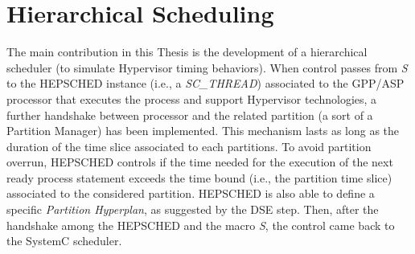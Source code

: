 \section{Hierarchical Scheduling}
%
The main contribution in this Thesis is the development of a hierarchical scheduler (to simulate Hypervisor timing behaviors). When control passes from \textit{S} to the HEPSCHED instance (i.e., a \textit{SC\_THREAD}) associated to the GPP/ASP processor that executes the process and support Hypervisor technologies, a further handshake between processor and the related partition (a sort of a Partition Manager) has been implemented. This mechanism lasts as long as the duration of the time slice associated to each partitions. To avoid partition overrun, HEPSCHED controls if the time needed for the execution of the next ready process statement exceeds the time bound (i.e., the partition time slice) associated to the considered partition. HEPSCHED is also able to define a specific \textit{Partition Hyperplan}, as suggested by the DSE step. Then, after the handshake among the HEPSCHED and the macro \textit{S}, the control came back to the SystemC scheduler. \par
